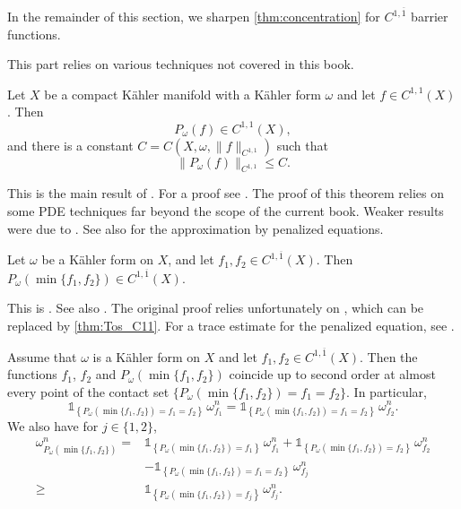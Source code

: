 In the remainder of this section, we sharpen \cref{thm:concentration} for $C^{1,\overline{1}}$ barrier functions.

This part relies on various techniques not covered in this book.




\begin{theorem}\label{thm:Tos_C11}
Let $X$ be a compact Kähler manifold with a Kähler form $\omega$ and let $f\in C^{1,1}(X)$. Then
\[
P_\omega(f)\in C^{1,1}(X),
\]
and there is a constant $C=C(X,\omega,\|f\|_{C^{1,1}})$ such that
\[
    \|P_\omega(f)\|_{C^{1,1}}\leq C.
\]
\end{theorem}
This is the main result of \cite{Tos18,CZ19}. For a proof see \cite[Theorem~16.2.26]{FPT}. The proof of this theorem relies on some PDE techniques far beyond the scope of the current book. Weaker results were due to \cite{Ber09, Ber19}. See also \cite[Proposition~16.2.22]{FPT} for the approximation by penalized equations.


\begin{proposition}\label{prop:DR16_C11bar}
Let $\omega$ be a K\"ahler form on $X$, and let $f_1,f_2\in C^{1,\overline{1}}(X)$. Then $P_\omega(\min\{f_1,f_2\})\in C^{1,\overline{1}}(X)$.
\end{proposition}
This is \cite[Theorem~2.5]{DR16}. See also \cite[Theorem~16.2.24]{FPT}. The original proof relies unfortunately on \cite{BD12}, which can be replaced by \cref{thm:Tos_C11}. For a trace estimate for the penalized equation, see \cite[Lemma~16.2.15]{FPT}.



\begin{lemma}\label{lma:DNTroof}
Assume that $\omega$ is a K\"ahler form on $X$ and let $f_1,f_2\in C^{1,\overline{1}}(X)$. Then the functions $f_1$, $f_2$ and $P_\omega(\min\{f_1,f_2\})$ coincide up to second order at almost every point of the contact set $\{P_\omega(\min\{f_1,f_2\})=f_1=f_2\}$. In particular,
\[
    \mathds{1}_{\left\{P_\omega\left(\min\{f_1,f_2\}\right)=f_1=f_2\right\}}\,\omega_{f_1}^n=\mathds{1}_{\left\{P_\omega\left(\min\{f_1,f_2\}\right)=f_1=f_2\right\}}\,\omega_{f_2}^n.
\]
We also have for $j\in \{1,2\}$,
\begin{equation}\label{eq:DNTroof_Pomega}
    \begin{aligned}
    \omega^n_{P_\omega\left(\min\{f_1,f_2\}\right)} = & \mathds{1}_{\left\{P_\omega\left(\min\{f_1,f_2\}\right)=f_1\right\}}\,\omega^n_{f_1} + \mathds{1}_{\left\{P_\omega\left(\min\{f_1,f_2\}\right)=f_2\right\}}\,\omega^n_{f_2} \\
    &- \mathds{1}_{\left\{P_\omega(\min\{f_1,f_2\})=f_1=f_2\right\}}\,\omega^n_{f_j}\\
    \geq & \mathds{1}_{\left\{P_\omega\left(\min\{f_1,f_2\}\right)=f_j\right\}}\,\omega^n_{f_j}.
    \end{aligned}
\end{equation}
\end{lemma}

